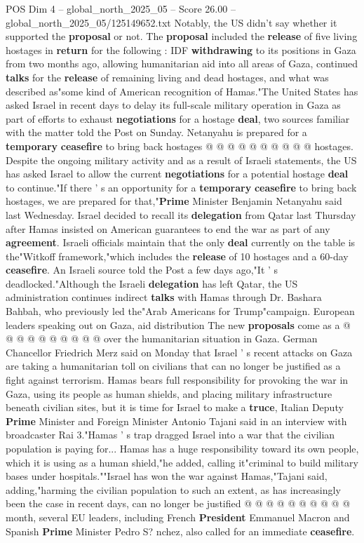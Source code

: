 \begin{textsample}{POS Dim 4 – global\_north\_2025\_05 – Score 26.00 – global\_north\_2025\_05/125149652.txt}
Notably, the US didn't say whether it supported the \textbf{proposal} or not.
The \textbf{proposal} included the \textbf{release} of five living hostages in \textbf{return} for the following : IDF \textbf{withdrawing} to its positions in Gaza from two months ago, allowing humanitarian aid into all areas of Gaza, continued \textbf{talks} for the \textbf{release} of remaining living and dead hostages, and what was described as"some kind of American recognition of Hamas."The United States has asked Israel in recent days to delay its full-scale military operation in Gaza as part of efforts to exhaust \textbf{negotiations} for a hostage \textbf{deal}, two sources familiar with the matter told the Post on Sunday.
Netanyahu is prepared for a \textbf{temporary} \textbf{ceasefire} to bring back hostages @ @ @ @ @ @ @ @ @ @ hostages.
Despite the ongoing military activity and as a result of Israeli statements, the US has asked Israel to allow the current \textbf{negotiations} for a potential hostage \textbf{deal} to continue."If there ' s an opportunity for a \textbf{temporary} \textbf{ceasefire} to bring back hostages, we are prepared for that,"\textbf{Prime} Minister Benjamin Netanyahu said last Wednesday.
Israel decided to recall its \textbf{delegation} from Qatar last Thursday after Hamas insisted on American guarantees to end the war as part of any \textbf{agreement}.
Israeli officials maintain that the only \textbf{deal} currently on the table is the"Witkoff framework,"which includes the \textbf{release} of 10 hostages and a 60-day \textbf{ceasefire}.
An Israeli source told the Post a few days ago,"It ' s deadlocked."Although the Israeli \textbf{delegation} has left Qatar, the US administration continues indirect \textbf{talks} with Hamas through Dr.
Bashara Bahbah, who previously led the"Arab Americans for Trump"campaign.
European leaders speaking out on Gaza, aid distribution The new \textbf{proposals} come as a @ @ @ @ @ @ @ @ @ @ over the humanitarian situation in Gaza.
German Chancellor Friedrich Merz said on Monday that Israel ' s recent attacks on Gaza are taking a humanitarian toll on civilians that can no longer be justified as a fight against terrorism.
Hamas bears full responsibility for provoking the war in Gaza, using its people as human shields, and placing military infrastructure beneath civilian sites, but it is time for Israel to make a \textbf{truce}, Italian Deputy \textbf{Prime} Minister and Foreign Minister Antonio Tajani said in an interview with broadcaster Rai 3."Hamas ' s trap dragged Israel into a war that the civilian population is paying for...
Hamas has a huge responsibility toward its own people, which it is using as a human shield,"he added, calling it"criminal to build military bases under hospitals.""Israel has won the war against Hamas,"Tajani said, adding,"harming the civilian population to such an extent, as has increasingly been the case in recent days, can no longer be justified @ @ @ @ @ @ @ @ @ @ month, several EU leaders, including French \textbf{President} Emmanuel Macron and Spanish \textbf{Prime} Minister Pedro S? nchez, also called for an immediate \textbf{ceasefire}.


\end{textsample}
